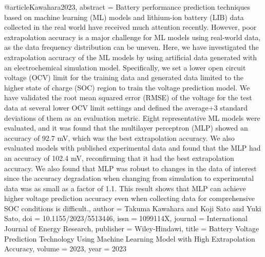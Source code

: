 @article{Kawahara2023,
   abstract = {Battery performance prediction techniques based on machine learning (ML) models and lithium-ion battery (LIB) data collected in the real world have received much attention recently. However, poor extrapolation accuracy is a major challenge for ML models using real-world data, as the data frequency distribution can be uneven. Here, we have investigated the extrapolation accuracy of the ML models by using artificial data generated with an electrochemical simulation model. Specifically, we set a lower open circuit voltage (OCV) limit for the training data and generated data limited to the higher state of charge (SOC) region to train the voltage prediction model. We have validated the root mean squared error (RMSE) of the voltage for the test data at several lower OCV limit settings and defined the average+3 standard deviations of them as an evaluation metric. Eight representative ML models were evaluated, and it was found that the multilayer perceptron (MLP) showed an accuracy of 92.7 mV, which was the best extrapolation accuracy. We also evaluated models with published experimental data and found that the MLP had an accuracy of 102.4 mV, reconfirming that it had the best extrapolation accuracy. We also found that MLP was robust to changes in the data of interest since the accuracy degradation when changing from simulation to experimental data was as small as a factor of 1.1. This result shows that MLP can achieve higher voltage prediction accuracy even when collecting data for comprehensive SOC conditions is difficult.},
   author = {Takuma Kawahara and Koji Sato and Yuki Sato},
   doi = {10.1155/2023/5513446},
   issn = {1099114X},
   journal = {International Journal of Energy Research},
   publisher = {Wiley-Hindawi},
   title = {Battery Voltage Prediction Technology Using Machine Learning Model with High Extrapolation Accuracy},
   volume = {2023},
   year = {2023}
}
